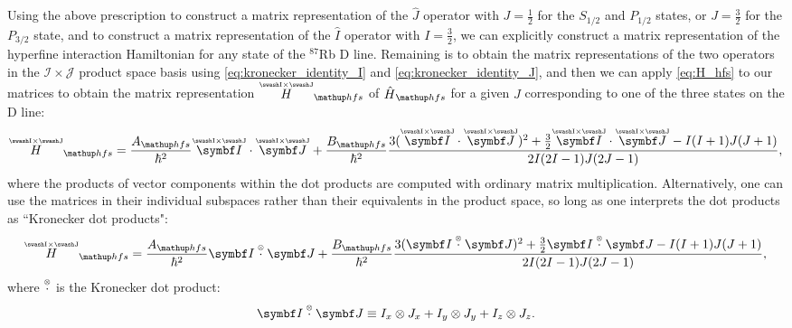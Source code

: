 Using the above prescription to construct a matrix representation of the $\hat J$ operator with $J=\frac12$ for the $S_{1/2}$ and $P_{1/2}$ states, or $J=\frac32$ for the $P_{3/2}$ state, and to construct a matrix representation of the $\hat I$ operator with $I=\frac32$, we can explicitly construct a matrix representation of the hyperfine interaction Hamiltonian for any state of the $^{87}$Rb D line. Remaining is to obtain the matrix representations of the two operators in the $\mathcal{I}\times\mathcal{J}$ product space basis using \eqref{eq:kronecker_identity_I} and \eqref{eq:kronecker_identity_J}, and then we can apply \eqref{eq:H_hfs} to our matrices to obtain the matrix representation $\oversetIJ H_\up{hfs}$ of $\hat H_\up{hfs}$ for a given $J$ corresponding to one of the three states on the D line:
\begin{align}\label{eq:H_hfs_matrix}
\oversetIJ H_\up{hfs} = \frac{A_\up{hfs}}{\hbar^2}
\oversetIJ{\vec I} \cdot
\oversetIJ{\vec J}
+ \frac{B_\up{hfs}}{\hbar^2}\frac
{3(\oversetIJ{\vec I}\cdot
\oversetIJ{\vec J})^2
+ \frac32 \oversetIJ{\vec I}\cdot
\oversetIJ{\vec J}
 - I(I + 1)J(J + 1)}
{2I(2I - 1)J(2J - 1)},
\end{align}
where the products of vector components within the dot products are computed with ordinary matrix multiplication. Alternatively, one can use the matrices in their individual subspaces rather than their equivalents in the product space, so long as one interprets the dot products as ``Kronecker dot products":
\begin{align}\label{eq:H_hfs_matrix_kron}
\oversetIJ H_\up{hfs} = \frac{A_\up{hfs}}{\hbar^2}
\vec I \krondot \vec J
+ \frac{B_\up{hfs}}{\hbar^2}\frac
{3(\vec I \krondot \vec J)^2
+ \frac32 \vec I \krondot \vec J
 - I(I + 1)J(J + 1)}
{2I(2I - 1)J(2J - 1)},
\end{align}
where $\overset{\scriptscriptstyle\otimes}\cdot$ is the Kronecker dot product:
\begin{align}
\vec I \krondot \vec J \equiv I_x \otimes J_x + I_y \otimes J_y + I_z \otimes J_z.
\end{align}

